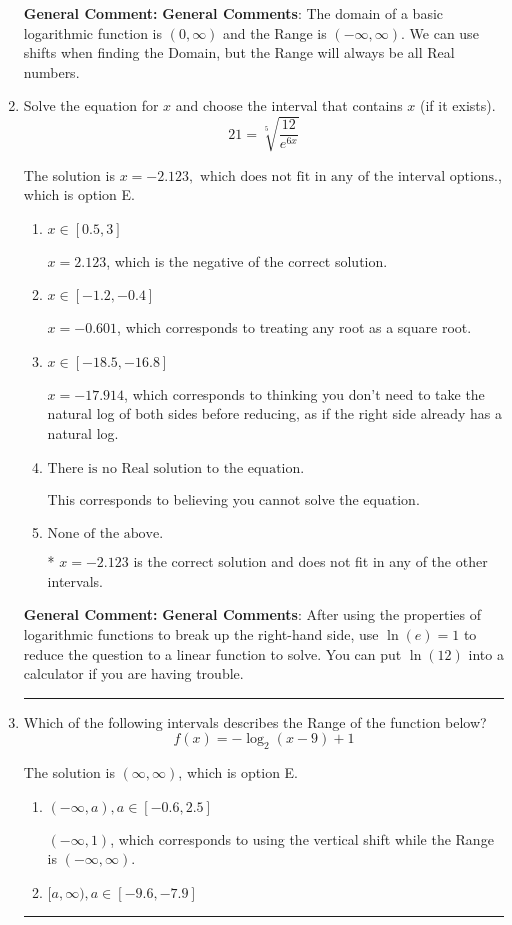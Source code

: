 \documentclass{extbook}[14pt]
\newcommand{\litem}[1]{\item #1

\rule{\textwidth}{0.4pt}}
\begin{document}
\begin{enumerate}
{\textbf{General Comment:} \textbf{General Comments}: The domain of a basic logarithmic function is $(0, \infty)$ and the Range is $(-\infty, \infty)$. We can use shifts when finding the Domain, but the Range will always be all Real numbers.
}
\litem{
 Solve the equation for $x$ and choose the interval that contains $x$ (if it exists).
\[  21 = \sqrt[5]{\frac{12}{e^{6x}}} \]

The solution is \( x = -2.123, \text{ which does not fit in any of the interval options.} \), which is option E.\begin{enumerate}[label=\Alph*.]
\item \( x \in [0.5, 3] \)

$x = 2.123$, which is the negative of the correct solution.
\item \( x \in [-1.2, -0.4] \)

$x = -0.601$, which corresponds to treating any root as a square root.
\item \( x \in [-18.5, -16.8] \)

$x = -17.914$, which corresponds to thinking you don't need to take the natural log of both sides before reducing, as if the right side already has a natural log.
\item \( \text{There is no Real solution to the equation.} \)

This corresponds to believing you cannot solve the equation.
\item \( \text{None of the above.} \)

* $x = -2.123$ is the correct solution and does not fit in any of the other intervals.
\end{enumerate}

\textbf{General Comment:} \textbf{General Comments}: After using the properties of logarithmic functions to break up the right-hand side, use $\ln(e) = 1$ to reduce the question to a linear function to solve. You can put $\ln(12)$ into a calculator if you are having trouble.
}
\litem{
Which of the following intervals describes the Range of the function below?
\[ f(x) = -\log_2{(x-9)}+1 \]

The solution is \( (\infty, \infty) \), which is option E.\begin{enumerate}[label=\Alph*.]
\item \( (-\infty, a), a \in [-0.6, 2.5] \)

$(-\infty, 1)$, which corresponds to using the vertical shift while the Range is $(-\infty, \infty)$.
\item \( [a, \infty), a \in [-9.6, -7.9] \)


\end{enumerate}}
\end{enumerate}
\end{document}
